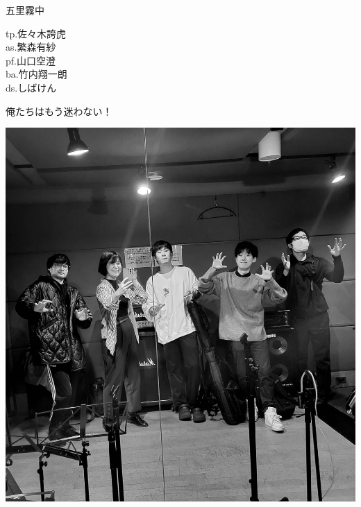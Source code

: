\documentclass[a4paper]{article}
\begin{document}
\begin{minipage}{\textwidth - 0.25\textheight}
    \flushleft
    \Huge \vspace{1em}五里霧中\vspace{1em}\normalsize \\
    \begin{minipage}{15em}
        \flushleft
        \Large
        tp.佐々木誇虎\\as.繁森有紗\\pf.山口空澄\\ba.竹内翔一朗\\ds.しばけん
    \end{minipage}
    \begin{minipage}{\textwidth - 18em}
        \flushleft
        \large
        俺たちはもう迷わない！
    \end{minipage}
\end{minipage}
\begin{minipage}{0.25\textheight}
    \flushleft
    \includegraphics[width=0.25\textheight]{./FULLHOUSE/resources/15.jpeg}
\end{minipage}
\end{document}
